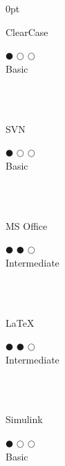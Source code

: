 \documentclass[a4paper]{article}
\begin{document}
\begin{adjustwidth}{\parindent}{0pt}
\begin{minipage}[t]{0.25\textwidth}
 \begin{minipage}{0.65\textwidth}
   \small{ClearCase}
 \end{minipage}
 \begin{minipage}{0.3\textwidth}
   \centering $\mdlgblkcircle$ $\mdlgwhtcircle$ $\mdlgwhtcircle$ \\  \footnotesize{Basic}
 \end{minipage} \\ \hspace{0pt} \\

 \begin{minipage}{0.65\textwidth}
  \small{SVN}
 \end{minipage}
 \begin{minipage}{0.3\textwidth}
  \centering $\mdlgblkcircle$ $\mdlgwhtcircle$ $\mdlgwhtcircle$ \\  \footnotesize{Basic}
 \end{minipage} \\ \hspace{0pt} \\
 
 \begin{minipage}{0.65\textwidth}
   \small{MS Office}
 \end{minipage}
 \begin{minipage}{0.3\textwidth}
   \centering $\mdlgblkcircle$ $\mdlgblkcircle$ $\mdlgwhtcircle$ \\  \footnotesize{Intermediate}
 \end{minipage} \\ \hspace{0pt} \\
 
 \begin{minipage}{0.65\textwidth}
   \small{\LaTeX}
 \end{minipage}
 \begin{minipage}{0.3\textwidth}
   \centering $\mdlgblkcircle$ $\mdlgblkcircle$ $\mdlgwhtcircle$ \\  \footnotesize{Intermediate}
 \end{minipage} \\ \hspace{0pt} \\
 
 \begin{minipage}{0.65\textwidth}
   \small{Simulink}
 \end{minipage}
 \begin{minipage}{0.3\textwidth}
   \centering $\mdlgblkcircle$ $\mdlgwhtcircle$ $\mdlgwhtcircle$ \\  \footnotesize{Basic}
 \end{minipage} \\ \hspace{0pt} \\
 

\end{minipage}
\end{adjustwidth}
\end{document}
